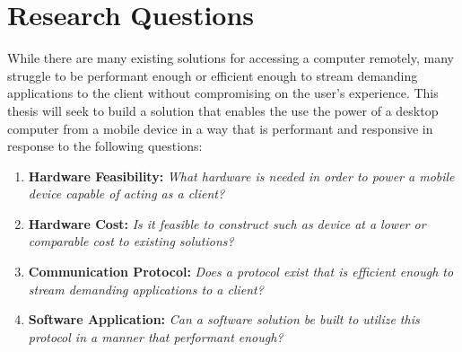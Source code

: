 \section{Research Questions}\label{sec:ResearchQuestions}

While there are many existing solutions for accessing a computer remotely, many struggle to be performant enough or efficient enough to stream demanding applications to the client without compromising on the user's experience.
This thesis will seek to build a solution that enables the use the power of a desktop computer from a mobile device in a way that is performant and responsive in response to the following questions:

\begin{enumerate}
  \item \textbf{Hardware Feasibility:} \emph{What hardware is needed in order to power a mobile device capable of acting as a client?}
  \item \textbf{Hardware Cost:} \emph{Is it feasible to construct such as device at a lower or comparable cost to existing solutions?}
  \item \textbf{Communication Protocol:} \emph{Does a protocol exist that is efficient enough to stream demanding applications to a client?}
  \item \textbf{Software Application:} \emph{Can a software solution be built to utilize this protocol in a manner that performant enough?}
\end{enumerate}